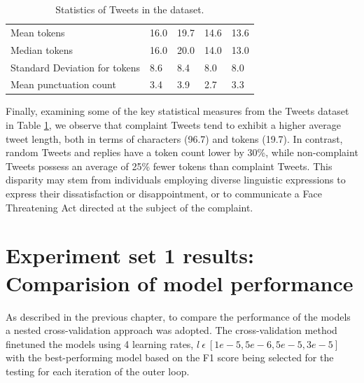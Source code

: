 \begin{table}[htbp]
\begin{tabularx}{\textwidth}{|l|X|X|X|X|}
        Mean tokens                     & 16.0                & 19.7                & 14.6                    & 13.6            \\
        \rowcolor[gray]{0.9}
        Median tokens                   & 16.0                & 20.0                & 14.0                    & 13.0            \\
        Standard Deviation for tokens   & 8.6                 & 8.4                 & 8.0                     & 8.0             \\
        \hline
        \hline
        Mean punctuation count          & 3.4                 & 3.9                 & 2.7                     & 3.3             \\
        \hline
    \end{tabularx}
    \caption{Statistics of Tweets in the dataset.}
    \label{tab: tweets_statistics}
\end{table}

Finally, examining some of the key statistical measures from the Tweets dataset in Table \ref{tab: tweets_statistics}, we observe that complaint Tweets tend to exhibit a higher average tweet length, both in terms of characters (96.7) and tokens (19.7). In contrast, random Tweets and replies have a token count lower by 30\%, while non-complaint Tweets possess an average of 25\% fewer tokens than complaint Tweets. This disparity may stem from individuals employing diverse linguistic expressions to express their dissatisfaction or disappointment, or to communicate a Face Threatening Act directed at the subject of the complaint.

\section{Experiment set 1 results: Comparision of model performance}
As described in the previous chapter, to compare the performance of the models a nested cross-validation approach was adopted. The cross-validation method finetuned the models using 4 learning rates, $l\:\epsilon\:[1e-5, 5e-6, 5e-5, 3e-5]$ with the best-performing model based on the F1 score being selected for the testing for each iteration of the outer loop. \\

